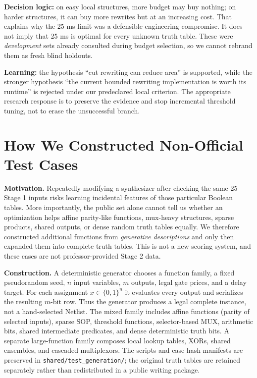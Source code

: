 \textbf{Decision logic:} on easy local structures, more budget may buy nothing; on harder structures, it can buy more rewrites but at an increasing cost. That explains why the 25 ms limit was a defensible engineering compromise. It does not imply that 25 ms is optimal for every unknown truth table. These were \emph{development} sets already consulted during budget selection, so we cannot rebrand them as fresh blind holdouts.

\begin{tcolorbox}[colback=ResearchRose!16,colframe=ResearchRose,title=Decision after Round 6.1: No-Go for automatic promotion]
\textbf{Learning:} the hypothesis ``cut rewriting can reduce area'' is supported, while the stronger hypothesis ``the current bounded rewriting implementation is worth its runtime'' is rejected under our predeclared local criterion. The appropriate research response is to preserve the evidence and stop incremental threshold tuning, not to erase the unsuccessful branch.
\end{tcolorbox}

\section{How We Constructed Non-Official Test Cases}
\textbf{Motivation.} Repeatedly modifying a synthesizer after checking the same 25 Stage 1 inputs risks learning incidental features of those particular Boolean tables. More importantly, the public set alone cannot tell us whether an optimization helps affine parity-like functions, mux-heavy structures, sparse products, shared outputs, or dense random truth tables equally. We therefore constructed additional functions from \emph{generative descriptions} and only then expanded them into complete truth tables. This is not a new scoring system, and these cases are not professor-provided Stage 2 data.

\textbf{Construction.} A deterministic generator chooses a function family, a fixed pseudorandom seed, $n$ input variables, $m$ outputs, legal gate prices, and a delay target. For each assignment $x\in\{0,1\}^n$ it evaluates every output and serializes the resulting $m$-bit row. Thus the generator produces a legal complete instance, not a hand-selected Netlist. The mixed family includes affine functions (parity of selected inputs), sparse SOP, threshold functions, selector-based MUX, arithmetic bits, shared intermediate predicates, and dense deterministic truth bits. A separate large-function family composes local lookup tables, XORs, shared ensembles, and cascaded multiplexors. The scripts and case-hash manifests are preserved in \texttt{shared/test\_generation/}; the original truth tables are retained separately rather than redistributed in a public writing package.

